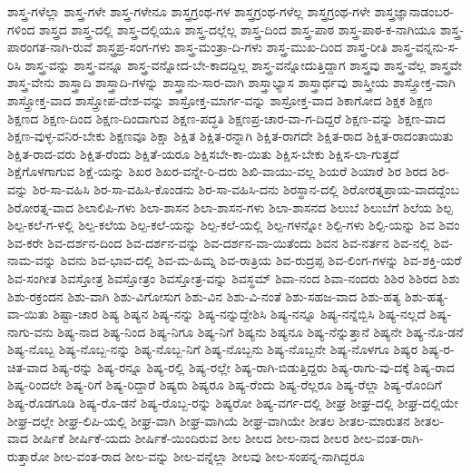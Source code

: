 ಶಾಸ್ತ್ರ-ಗಳೆಲ್ಲಾ
ಶಾಸ್ತ್ರ-ಗಳೇ
ಶಾಸ್ತ್ರ-ಗಳೇನೂ
ಶಾಸ್ತ್ರಗ್ರಂಥ-ಗಳ
ಶಾಸ್ತ್ರಗ್ರಂಥ-ಗಳೆಲ್ಲ
ಶಾಸ್ತ್ರಗ್ರಂಥ-ಗಳೇ
ಶಾಸ್ತ್ರಜ್ಞಾನಾಡಂಬರ-ಗಳಿಂದ
ಶಾಸ್ತ್ರದ
ಶಾಸ್ತ್ರ-ದಲ್ಲಿ
ಶಾಸ್ತ್ರ-ದಲ್ಲಿಯೂ
ಶಾಸ್ತ್ರ-ದಲ್ಲೆಲ್ಲ
ಶಾಸ್ತ್ರ-ದಿಂದ
ಶಾಸ್ತ್ರ-ಪಾಠ
ಶಾಸ್ತ್ರ-ಪಾಠ-ಕ-ನಾಗಿಯೂ
ಶಾಸ್ತ್ರ-ಪಾರಂಗತ-ನಾಗಿ-ರುವೆ
ಶಾಸ್ತ್ರಪ್ರ-ಸಂಗ-ಗಳು
ಶಾಸ್ತ್ರ-ಮಂತ್ರಾ-ದಿ-ಗಳು
ಶಾಸ್ತ್ರ-ಮುಖ-ದಿಂದ
ಶಾಸ್ತ್ರ-ರೀತಿ
ಶಾಸ್ತ್ರ-ವನ್ನನು-ಸ-ರಿಸಿ
ಶಾಸ್ತ್ರ-ವನ್ನು
ಶಾಸ್ತ್ರ-ವನ್ನೂ
ಶಾಸ್ತ್ರ-ವನ್ನೋದ-ಬೇ-ಕಾದದ್ದಿಲ್ಲ
ಶಾಸ್ತ್ರ-ವನ್ನೋದುತ್ತಿದ್ದಾಗ
ಶಾಸ್ತ್ರವು
ಶಾಸ್ತ್ರ-ವೆಲ್ಲ
ಶಾಸ್ತ್ರವೇ
ಶಾಸ್ತ್ರ-ವೇನು
ಶಾಸ್ತ್ರಾದಿ
ಶಾಸ್ತ್ರಾದಿ-ಗಳನ್ನು
ಶಾಸ್ತ್ರಾನು-ಸಾರ-ವಾಗಿ
ಶಾಸ್ತ್ರಾಭ್ಯಾಸ
ಶಾಸ್ತ್ರಾರ್ಥವು
ಶಾಸ್ತ್ರೀಯ
ಶಾಸ್ತ್ರೋಕ್ತ-ವಾಗಿ
ಶಾಸ್ತ್ರೋಕ್ತ-ವಾದ
ಶಾಸ್ತ್ರೋಪ-ದೇಶ-ವನ್ನು
ಶಾಸ್ರೋಕ್ತ-ಮಾರ್ಗ-ವನ್ನು
ಶಾಸ್ರೋಕ್ತ-ವಾದ
ಶಿಕಾಗೋದ
ಶಿಕ್ಷಕ
ಶಿಕ್ಷಣ
ಶಿಕ್ಷಣದ
ಶಿಕ್ಷಣ-ದಿಂದ
ಶಿಕ್ಷಣ-ದಿಂದಾಗುವ
ಶಿಕ್ಷಣ-ಪದ್ಧತಿ
ಶಿಕ್ಷಣಪ್ರ-ಚಾರ-ವಾ-ಗ-ದಿದ್ದರೆ
ಶಿಕ್ಷಣ-ವನ್ನು
ಶಿಕ್ಷಣ-ವಾದ
ಶಿಕ್ಷಣ-ವುಳ್ಳ-ವನಿರ-ಬೇಕು
ಶಿಕ್ಷಣವೂ
ಶಿಕ್ಷಾ
ಶಿಕ್ಷಿತ
ಶಿಕ್ಷಿತ-ರನ್ನಾಗಿ
ಶಿಕ್ಷಿತ-ರಾಗದೇ
ಶಿಕ್ಷಿತ-ರಾದ
ಶಿಕ್ಷಿತ-ರಾದಂತಾಯಿತು
ಶಿಕ್ಷಿತ-ರಾದ-ವರು
ಶಿಕ್ಷಿತ-ರೆಂದು
ಶಿಕ್ಷಿತೆ-ಯರೂ
ಶಿಕ್ಷಿಸಬೇ-ಕಾ-ಯಿತು
ಶಿಕ್ಷಿಸ-ಬೇಕು
ಶಿಕ್ಷಿಸ-ಲಾ-ಗುತ್ತದೆ
ಶಿಕ್ಷೆಗೊಳಗಾಗುವ
ಶಿಕ್ಷೆ-ಯನ್ನು
ಶಿಖರ
ಶಿಖರ-ವನ್ನೇ-ರಿ-ದರು
ಶಿಖಿ-ವಾಯು-ವಲ್ಲ
ಶಿಯರೆ
ಶಿಯಾರೆ
ಶಿರ
ಶಿರದ
ಶಿರ-ವನ್ನು
ಶಿರ-ಸಾ-ವಹಿಸಿ
ಶಿರ-ಸಾ-ವಹಿಸಿ-ಕೊಂಡನು
ಶಿರ-ಸಾ-ವಹಿಸಿ-ದನು
ಶಿರಸ್ಥಾನ-ದಲ್ಲಿ
ಶಿರೋರತ್ನಪ್ರಾಯ-ವಾದದ್ದೆಂಬ
ಶಿರೋರತ್ನ-ವಾದ
ಶಿಲಾಲಿಪಿ-ಗಳು
ಶಿಲಾ-ಶಾಸನ
ಶಿಲಾ-ಶಾಸನ-ಗಳು
ಶಿಲಾ-ಶಾಸನದ
ಶಿಲುಬೆ
ಶಿಲುಬೆಗೆ
ಶಿಲೆಯ
ಶಿಲ್ಪ
ಶಿಲ್ಪ-ಕಲೆ-ಗ-ಳಲ್ಲಿ
ಶಿಲ್ಪ-ಕಲೆಯ
ಶಿಲ್ಪ-ಕಲೆ-ಯನ್ನು
ಶಿಲ್ಪ-ಕಲೆ-ಯಲ್ಲಿ
ಶಿಲ್ಪ-ಗಳನ್ನೋ
ಶಿಲ್ಪಿ-ಗಳು
ಶಿಲ್ಪಿ-ಯನ್ನು
ಶಿವ
ಶಿವಂ
ಶಿವ-ಕರೇ
ಶಿವ-ದರ್ಶನ-ದಿಂದ
ಶಿವ-ದರ್ಶನ-ವನ್ನು
ಶಿವ-ದರ್ಶನ-ವಾ-ಯಿತೆಂದು
ಶಿವನ
ಶಿವ-ನರ್ತನ
ಶಿವ-ನಲ್ಲಿ
ಶಿವ-ನಾಮ-ವನ್ನು
ಶಿವನು
ಶಿವ-ಭಾವ-ದಲ್ಲಿ
ಶಿವ-ಮ-ಹಿಮ್ನ
ಶಿವ-ರಾತ್ರಿಯ
ಶಿವ-ರುದ್ರಪ್ಪ
ಶಿವ-ಲಿಂಗ-ಗಳನ್ನು
ಶಿವ-ಶಕ್ತಿ-ಯರೆ
ಶಿವ-ಸಂಗೀತ
ಶಿವಸ್ತೋತ್ರ
ಶಿವಸ್ತೋತ್ರಂ
ಶಿವಸ್ತೋತ್ರ-ವನ್ನು
ಶಿವಸ್ಥಮ್
ಶಿವಾ-ನಂದ
ಶಿವಾ-ನಂದರು
ಶಿಶಿರ
ಶಿಶಿರದ
ಶಿಶು
ಶಿಶು-ರಕ್ರಂದನ
ಶಿಶು-ವಾಗಿ
ಶಿಶು-ವಿಗೋಸುಗ
ಶಿಶು-ವಿನ
ಶಿಶು-ವಿ-ನಂತೆ
ಶಿಶು-ಸಹಜ-ವಾದ
ಶಿಶು-ಹತ್ಯ
ಶಿಶು-ಹತ್ಯ-ವಾ-ಯಿತು
ಶಿಷ್ಟಾ-ಚಾರ
ಶಿಷ್ಯ
ಶಿಷ್ಯನ
ಶಿಷ್ಯ-ನನ್ನು
ಶಿಷ್ಯ-ನನ್ನುದ್ದೇಶಿಸಿ
ಶಿಷ್ಯ-ನನ್ನೂ
ಶಿಷ್ಯ-ನನ್ನೆಬ್ಬಿಸಿ
ಶಿಷ್ಯ-ನಲ್ಲದೆ
ಶಿಷ್ಯ-ನಾಗು-ವನು
ಶಿಷ್ಯ-ನಾದ
ಶಿಷ್ಯ-ನಿಂದ
ಶಿಷ್ಯ-ನಿಗೂ
ಶಿಷ್ಯ-ನಿಗೆ
ಶಿಷ್ಯನು
ಶಿಷ್ಯನೂ
ಶಿಷ್ಯ-ನೆನ್ನುತ್ತಾನೆ
ಶಿಷ್ಯನೇ
ಶಿಷ್ಯ-ನೊ-ಡನೆ
ಶಿಷ್ಯ-ನೊಬ್ಬ
ಶಿಷ್ಯ-ನೊಬ್ಬ-ನನ್ನು
ಶಿಷ್ಯ-ನೊಬ್ಬ-ನಿಗೆ
ಶಿಷ್ಯ-ನೊಬ್ಬನು
ಶಿಷ್ಯ-ನೊಬ್ಬನೇ
ಶಿಷ್ಯ-ನೊಳಗೂ
ಶಿಷ್ಯರ
ಶಿಷ್ಯ-ರ-ಚಿತ-ವಾದ
ಶಿಷ್ಯ-ರನ್ನು
ಶಿಷ್ಯ-ರನ್ನೂ
ಶಿಷ್ಯ-ರಲ್ಲಿ
ಶಿಷ್ಯ-ರಲ್ಲೇ
ಶಿಷ್ಯ-ರಾಗಿ-ಬಿಡುತ್ತಿದ್ದರು
ಶಿಷ್ಯ-ರಾಗು-ವು-ದಕ್ಕೆ
ಶಿಷ್ಯ-ರಾದ
ಶಿಷ್ಯ-ರಿಂದಲೇ
ಶಿಷ್ಯ-ರಿಗೆ
ಶಿಷ್ಯ-ರಿದ್ದಾರೆ
ಶಿಷ್ಯರು
ಶಿಷ್ಯರೂ
ಶಿಷ್ಯ-ರೆಂದು
ಶಿಷ್ಯ-ರೆಲ್ಲರೂ
ಶಿಷ್ಯ-ರೆಲ್ಲಾ
ಶಿಷ್ಯ-ರೊಂದಿಗೆ
ಶಿಷ್ಯ-ರೊಡಗೂಡಿ
ಶಿಷ್ಯ-ರೊ-ಡನೆ
ಶಿಷ್ಯ-ರೊಬ್ಬ-ರನ್ನು
ಶಿಷ್ಯರೋ
ಶಿಷ್ಯ-ವರ್ಗ-ದಲ್ಲಿ
ಶೀಘ್ರ
ಶೀಘ್ರ-ದಲ್ಲಿ
ಶೀಘ್ರ-ದಲ್ಲಿಯೇ
ಶೀಘ್ರ-ದಲ್ಲೇ
ಶೀಘ್ರ-ಲಿಪಿ-ಯಲ್ಲಿ
ಶೀಘ್ರ-ವಾಗಿ
ಶೀಘ್ರ-ವಾಗಿಯೆ
ಶೀಘ್ರ-ವಾಗಿಯೇ
ಶೀತಲ
ಶೀತಲ-ಮಾರುತನ
ಶೀತಲ-ವಾದ
ಶೀರ್ಷಿಕೆ
ಶೀರ್ಷಿಕೆ-ಯದು
ಶೀರ್ಷಿಕೆ-ಯಿಂದಿರುವ
ಶೀಲ
ಶೀಲದ
ಶೀಲ-ನಾದ
ಶೀಲರ
ಶೀಲ-ವಂತ-ರಾಗಿ-ರುತ್ತಾರೋ
ಶೀಲ-ವಂತ-ರಾದ
ಶೀಲ-ವನ್ನು
ಶೀಲ-ವನ್ನೆಲ್ಲಾ
ಶೀಲವು
ಶೀಲ-ಸಂಪನ್ನ-ನಾಗಿದ್ದರೂ
